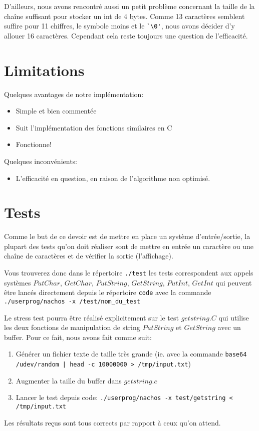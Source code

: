 \documentclass[12pt,a4paper]{article}
\begin{document}
D'ailleurs, nous avons rencontré aussi un petit problème concernant la taille de la chaîne suffisant pour stocker un int de 4 bytes. Comme 13 caractères semblent suffire pour 11 chiffres, le symbole moins et le \verb$`\0'$, nous avons décider d'y allouer 16 caractères. Cependant cela reste toujours une question de l'efficacité.

\section{Limitations}
Quelques avantages de notre implémentation:
\begin{itemize}
\item Simple et bien commentée
\item Suit l'implémentation des fonctions similaires en C
\item Fonctionne!
\end{itemize}

Quelques inconvénients:
\begin{itemize}
\item L'efficacité en question, en raison de l'algorithme non optimisé.
\end{itemize}

\section{Tests}
Comme le but de ce devoir est de mettre en place un système d'entrée/sortie, la plupart des tests qu'on doit réaliser sont de mettre en entrée un caractère ou une chaîne de caractères et de vérifier la sortie (l'affichage).

Vous trouverez donc dans le répertoire \verb$./test$ les tests correspondent aux appels systèmes $PutChar$, $GetChar$, $PutString$, $GetString$, $PutInt$, $GetInt$ qui peuvent être lancés directement depuis le répertoire \verb$code$ avec la commande \texttt{./userprog/nachos -x /test/nom\_du\_test}

Le stress test pourra être réalisé explicitement sur le test $getstring.C$ qui utilise les deux fonctions de manipulation de string $PutString$ et $GetString$ avec un buffer. Pour ce fait, nous avons fait comme suit:

\begin{enumerate}
\item Générer un fichier texte de taille très grande (ie. avec la commande \texttt{base64 /udev/random | head -c 10000000 > /tmp/input.txt})
\item Augmenter la taille du buffer dans $getstring.c$
\item Lancer le test depuis code: \texttt{./userprog/nachos -x test/getstring < /tmp/input.txt}
\end{enumerate}

Les résultats reçus sont tous corrects par rapport à ceux qu'on attend.
\end{document}

